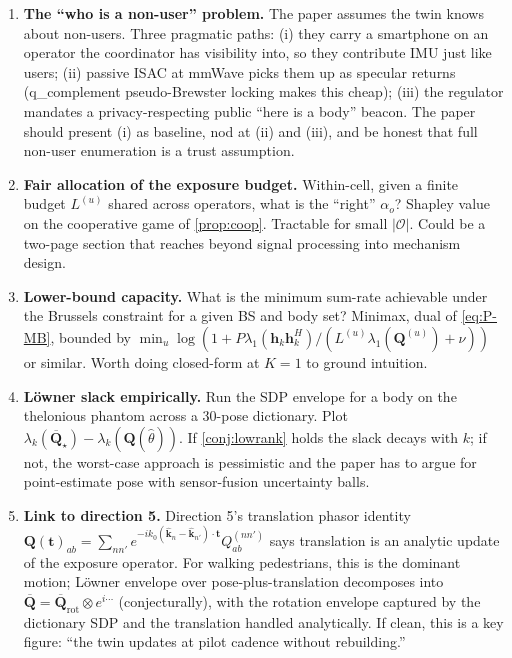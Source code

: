 \documentclass[11pt,a4paper]{article}
\theoremstyle{definition}
\newcommand{\khat}{\hat{\bm{k}}}
\newcommand{\hh}{\mathbf{h}}
\newcommand{\Q}{\mathbf{Q}}
\newcommand{\Qbar}{\overline{\mathbf{Q}}}
\newcommand{\Ops}{\mathcal{O}}
\begin{document}
\begin{enumerate}[leftmargin=1.6em,itemsep=3pt]

\item \textbf{The ``who is a non-user'' problem.} The paper assumes
the twin knows about non-users. Three pragmatic paths:
(i) they carry a smartphone on an operator the coordinator has
visibility into, so they contribute IMU just like users;
(ii) passive ISAC at mmWave picks them up as specular returns
(q\_complement pseudo-Brewster locking makes this cheap);
(iii) the regulator mandates a privacy-respecting public
``here is a body'' beacon. The paper should present (i) as baseline,
nod at (ii) and (iii), and be honest that full non-user enumeration
is a trust assumption.

\item \textbf{Fair allocation of the exposure budget.} Within-cell,
given a finite budget $L^{(u)}$ shared across operators, what is
the ``right'' $\alpha_o$? Shapley value on the cooperative game of
\cref{prop:coop}. Tractable for small $|\Ops|$. Could be a two-page
section that reaches beyond signal processing into mechanism design.

\item \textbf{Lower-bound capacity.} What is the minimum sum-rate
achievable under the Brussels constraint for a given BS and body set?
Minimax, dual of \eqref{eq:P-MB}, bounded by
$\min_u \log(1+P\lambda_1(\hh_k\hh_k^H)/(L^{(u)}\lambda_1(\Q^{(u)})+\nu))$
or similar. Worth doing closed-form at $K=1$ to ground intuition.

\item \textbf{Löwner slack empirically.} Run the SDP envelope for
a body on the thelonious phantom across a 30-pose dictionary. Plot
$\lambda_k(\Qbar_\star)-\lambda_k(\Q(\hat\theta))$. If
\cref{conj:lowrank} holds the slack decays with $k$; if not, the
worst-case approach is pessimistic and the paper has to argue for
point-estimate pose with sensor-fusion uncertainty balls.

\item \textbf{Link to direction 5.} Direction 5's translation phasor
identity
$\Q(\mathbf{t})_{ab}=\sum_{nn'}e^{-ik_0(\khat_n-\khat_{n'})\cdot\mathbf{t}}Q_{ab}^{(nn')}$
says translation is an analytic update of the exposure operator. For
walking pedestrians, this is the dominant motion; Löwner envelope
over pose-plus-translation decomposes into
$\Qbar=\Qbar_{\mathrm{rot}}\otimes e^{i\cdots}$ (conjecturally), with
the rotation envelope captured by the dictionary SDP and the
translation handled analytically. If clean, this is a key figure:
``the twin updates at pilot cadence without rebuilding.''


\end{enumerate}
\end{document}
